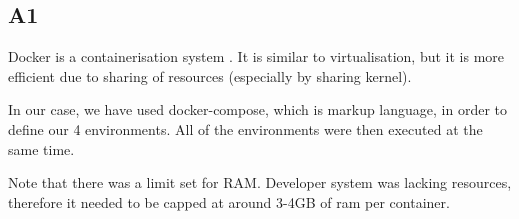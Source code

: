 \subsection{A1}\label{A1}

Docker is a containerisation system \parencite{docker2020docker}. It is similar to virtualisation, but it is more efficient due to sharing of resources (especially by sharing kernel).

In our case, we have used docker-compose, which is markup language, in order to define our 4 environments. All of the environments were then executed at the same time.

Note that there was a limit set for RAM. Developer system was lacking resources, therefore it needed to be capped at around 3-4GB of ram per container.